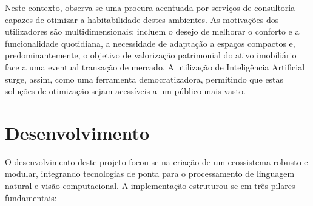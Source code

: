 \documentclass[a4paper,12pt]{scrreprt}
\begin{document}
        Neste contexto, observa-se uma procura acentuada por serviços de consultoria capazes de otimizar a habitabilidade destes ambientes. As motivações dos utilizadores são multidimensionais: incluem o desejo de melhorar o conforto e a funcionalidade quotidiana, a necessidade de adaptação a espaços compactos e, predominantemente, o objetivo de valorização patrimonial do ativo imobiliário face a uma eventual transação de mercado. A utilização de Inteligência Artificial surge, assim, como uma ferramenta democratizadora, permitindo que estas soluções de otimização sejam acessíveis a um público mais vasto.




\chapter{Desenvolvimento}
    O desenvolvimento deste projeto focou-se na criação de um ecossistema robusto e modular, integrando tecnologias de ponta para o processamento de linguagem natural e visão computacional. A implementação estruturou-se em três pilares fundamentais:
\end{document}
